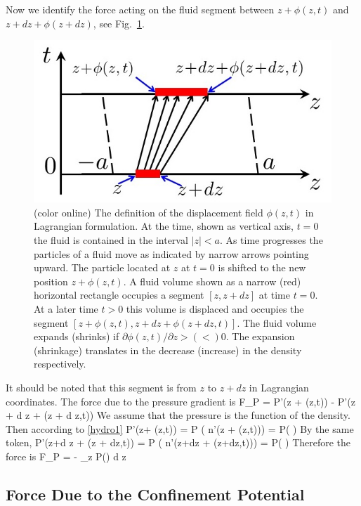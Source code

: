 Now we identify the force acting on the fluid segment between 
$z + \phi(z,t)$ and $z + d z + \phi(z + d z)$, see Fig.~\ref{Fig-phi}.

\begin{figure}
\begin{centering}
\includegraphics[width=0.5\columnwidth]{displacement_2}
\caption{(color online)
The definition of the displacement field $\phi(z,t)$ in Lagrangian formulation. 
At the time, shown as vertical axis, $t=0$ the fluid is contained in the interval $|z|<a$.
As time progresses the particles of a fluid move as indicated by narrow arrows pointing upward.
The particle located at $z$ at $t=0$ is shifted to the new position $z+\phi(z,t)$. 
A fluid volume shown as a narrow (red) horizontal rectangle occupies a segment $[z,z+dz]$ at time $t=0$.
At a later time $t>0$ this volume is displaced and occupies the segment $[z+\phi(z,t),z+dz+\phi(z+dz,t)]$.
The fluid volume expands (shrinks) if $\partial \phi(z,t)/ \partial z > (<) 0$.
The expansion (shrinkage) translates in the decrease (increase) in the density respectively.\cite{Iqbal2}}
\label{Fig-phi}
\end{centering}
\end{figure}


It should be noted that this segment is from $z$ to $z + d z$ in Lagrangian coordinates.
The force due to the pressure gradient is
\be\label{F_P}
F_P = P'(z + \phi(z,t)) - P'(z + d z + \phi(z + d z,t))
\ee
We assume that the pressure is the function of the density.
Then according to \eqref{hydro1} 
\be
P'(z+ \phi(z,t)) = P ( n'(z + \phi(z,t))) = P( )
\ee
By the same token,
\be
P'(z+d z + \phi(z + dz,t)) = P ( n'(z+dz + \phi(z+dz,t))) = P( )
\ee
Therefore the force is
\be
F_{P} = - \partial_z P() d z
\ee

\subsection{Force Due to the Confinement Potential}


